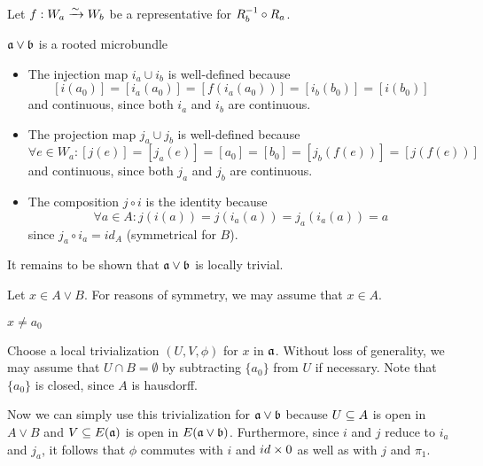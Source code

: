\begin{myproof}
    Let $f: W_a \xrightarrow{\sim} W_b$ be a representative for $R_b^{-1} \circ R_a$.

    \begin{sectionize}
        \item $\ba \vee \bb$ is a rooted microbundle
        \begin{itemize}
            \item The injection map $i_a \cup i_b$ is well-defined because
            \[ [i(a_0)] = [i_a(a_0)] = [f(i_a(a_0))] = [i_b(b_0)] = [i(b_0)] \]
            and continuous, since both $i_a$ and $i_b$ are continuous.
            \item The projection map $j_a \cup j_b$ is well-defined because
            \[ \forall e \in W_a: [j(e)] = [j_a(e)] = [a_0] = [b_0] = [j_b(f(e))] = [j(f(e))] \]
            and continuous, since both $j_a$ and $j_b$ are continuous.
            \item The composition $j \circ i$ is the identity because
            \[ \forall a \in A: j(i(a)) = j(i_a(a)) = j_a(i_a(a)) = a \]
            since $j_a \circ i_a = id_A$ (symmetrical for $B$).
        \end{itemize}
        It remains to be shown that $\ba \vee \bb$ is locally trivial.

        Let $x \in A \vee B$.
        For reasons of symmetry, we may assume that $x \in A$.
        \begin{caselist}
            \item $x \neq a_0$
            
            Choose a local trivialization $(U, V, \phi)$ for $x$ in $\mathfrak{a}$.
            Without loss of generality,
            we may assume that $U \cap B = \emptyset$ by subtracting
            $\{a_0\}$ from $U$ if necessary.
            Note that $\{a_0\}$ is closed, since $A$ is hausdorff.
            
            Now we can simply use this trivialization for $\ba \vee \bb$ because
            $U \subseteq{} A$ is open in $A \vee B$ and
            $V \subseteq{} E(\mathfrak{a})$ is open in $E(\ba \vee \bb)$.
            Furthermore, since $i$ and $j$ reduce to $i_a$ and $j_a$,
            it follows that $\phi$ commutes with $i$ and $id \times 0$
            as well as with $j$ and $\pi_1$.


\end{caselist}
\end{sectionize}
\end{myproof}
